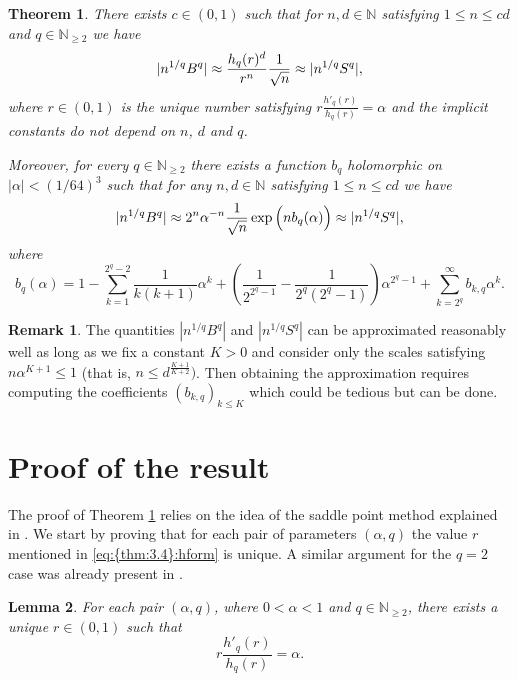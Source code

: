 \documentclass[a4paper,twoside, reqno]{amsart}
\numberwithin{equation}{section}
\newtheorem{Thm}{Theorem}[section]
\newtheorem{Lem}[Thm]{Lemma}
\theoremstyle{definition}%
\newtheorem{Rem}{Remark}
\theoremstyle{definition}
\theoremstyle{definition}%
\theoremstyle{definition}
\newcommand{\N}{\mathbb{N}}
\begin{document}
\begin{Thm}
\label{thm:3.4} There exists $c \in (0,1)$  such that for  $n,d \in \N$ satisfying  $1 \leq n \leq c d$ and $q\in\N_{\geq 2}$ we have
\begin{equation}
\label{eq:{thm:3.4}:hform}
|n^{1/q}B^q| \approx \frac{h_q(r)^d}{r^n} \frac{1}{\sqrt{n}} \approx |n^{1/q}S^q|,
\end{equation}
where $r \in (0,1)$ is the unique number satisfying $r \frac{h'_q(r)}{h_q(r)}=\alpha$ and the implicit constants do not depend on $n$, $d$ and $q$.

Moreover, for every $q\in\N_{\geq 2}$ there exists a function $b_q$ holomorphic on $|\alpha|< (1/64)^3$ such that for any $n,d \in \N$ satisfying $1 \leq n \leq cd$ we have
\begin{equation}
\label{eq:{thm:3.4}:expform}
|n^{1/q}B^q| \approx 2^n \alpha^{-n}  \frac{1}{\sqrt{n}
}\exp \Big(nb_q(\alpha) \Big) \approx |n^{1/q}S^q|,
\end{equation}
where
\[
b_q(\alpha) = 1 - \sum_{k=1}^{2^q-2}\frac{1}{k(k+1)}\alpha^k + \left(\frac{1}{2^{2^q-1}} - \frac{1}{2^q(2^q-1)}\right)\alpha^{2^q-1} + \sum_{k=2^q}^\infty b_{k,q}\alpha^k.
\]

\end{Thm}
\begin{Rem}
The quantities $|n^{1/q}B^q|$ and $|n^{1/q}S^q|$ can be approximated reasonably well as long as we fix a constant $K>0$ and consider only the scales satisfying $n \alpha^{K+1} \leq 1$ (that is, $n \leq d^{\frac{K+1}{K+2}})$. Then obtaining the approximation requires computing the coefficients $(b_{k,q})_{k \leq K}$ which could be tedious but can be done.
\end{Rem}



\section{Proof of the result}
The proof of Theorem \ref{thm:3.4} relies on the idea of the saddle point method explained in \cite[Section 3]{MO}. We start by proving that for each pair of parameters $(\alpha, q)$ the value $r$ mentioned in \eqref{eq:{thm:3.4}:hform} is unique. A similar argument for the $q=2$ case was already present in \cite{MO}.

\begin{Lem}
\label{lem:3.5}
For each pair $(\alpha, q)$, where $0<\alpha<1$ and $q\in\N_{\geq 2}$, there exists a unique $r \in (0,1)$ such that 
\[
r \frac{h'_q(r)}{h_q(r)}=\alpha.
\]
\end{Lem}
\end{document}
